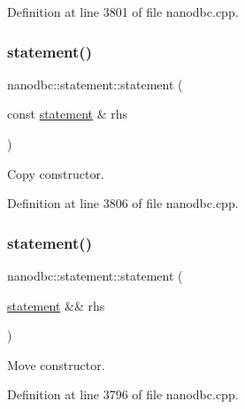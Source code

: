 Definition at line 3801 of file nanodbc.\+cpp.

\mbox{\label{classnanodbc_1_1statement_a78cdb0dbf1437cd98eff448e8c6a8757}} 
\subsubsection{\texorpdfstring{statement()}{statement()}\hspace{0.1cm}{\footnotesize\ttfamily [4/5]}}
{\footnotesize\ttfamily nanodbc\+::statement\+::statement (\begin{DoxyParamCaption}\item[{const \mbox{\hyperlink{classnanodbc_1_1statement}{statement}} \&}]{rhs }\end{DoxyParamCaption})}



Copy constructor. 



Definition at line 3806 of file nanodbc.\+cpp.

\mbox{\label{classnanodbc_1_1statement_a99b7708d308ee9313f5879ed09750fdf}} 
\subsubsection{\texorpdfstring{statement()}{statement()}\hspace{0.1cm}{\footnotesize\ttfamily [5/5]}}
{\footnotesize\ttfamily nanodbc\+::statement\+::statement (\begin{DoxyParamCaption}\item[{\mbox{\hyperlink{classnanodbc_1_1statement}{statement}} \&\&}]{rhs }\end{DoxyParamCaption})\hspace{0.3cm}{\ttfamily [noexcept]}}



Move constructor. 



Definition at line 3796 of file nanodbc.\+cpp.

\mbox{\label{classnanodbc_1_1statement_aa30610291426567164aab50aeacaa537}} 
